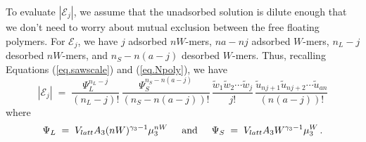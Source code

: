\documentclass[journal=mamobx,manuscript=article]{achemso}
\begin{document}
To evaluate $|\mathcal{E}_j|$, we assume that the unadsorbed solution
is dilute enough that we don't need to worry about mutual exclusion between the free floating
polymers.   
For $\mathcal{E}_j$, we have $j$ adsorbed $nW$-mers, $na-nj$ adsorbed $W$-mers, 
$n_L-j$ desorbed $nW$-mers, and $n_S-n(a-j)$ desorbed $W$-mers.   Thus, recalling 
Equations (\ref{eq.sawscale}) and  (\ref{eq.Npoly}), we have
\begin{equation}
    |\mathcal{E}_j|  
      \; = \; \frac{ \Psi_L^{n_L-j} }{(n_L-j)!} \,
          \frac{ \Psi_S^{n_S-n(a-j)} }{(n_S-n(a-j))!} \,
           \frac{\tilde{w}_1\tilde{w}_2\cdots \tilde{w}_j}{j!}
                     \,   \frac{\tilde{u}_{nj+1}\tilde{u}_{nj+2}\cdots \tilde{u}_{an}}{(n(a-j))!}
        \label{eq.Yj}
\end{equation}
where 
\begin{equation}
    \label{eq.psidef}   
   \Psi_L\;=\;V_{latt} A_3 (nW)^{\gamma_3-1} \mu_{3}^{nW}   
    \hspace{5mm}\hbox{and} \hspace{5mm}
     \Psi_S \;=\; V_{latt}A_3W^{\gamma_3-1}\mu_3^W \,.
\end{equation}
\end{document}
